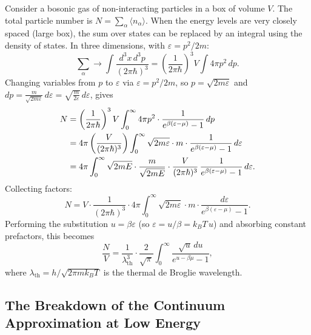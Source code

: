 Consider a bosonic gas of non-interacting particles in a box of volume $V$. The total particle number is $N = \sum_\alpha \langle n_\alpha\rangle$. When the energy levels are very closely spaced (large box), the sum over states can be replaced by an integral using the density of states. In three dimensions, with $\varepsilon = p^2/2m$:
\begin{equation}
    \sum_\alpha \to \int \frac{d^3x\,d^3p}{(2\pi\hbar)^3} = \left(\frac{1}{2\pi\hbar}\right)^3 V \int 4\pi p^2\,dp.
\end{equation}
Changing variables from $p$ to $\varepsilon$ via $\varepsilon = p^2/2m$, so $p = \sqrt{2m\varepsilon}$ and $dp = \frac{m}{\sqrt{2m\varepsilon}}\,d\varepsilon = \sqrt{\frac{m}{2\varepsilon}}\,d\varepsilon$, gives
\begin{align}
    N &= \left(\frac{1}{2\pi\hbar}\right)^3 V \int_0^\infty 4\pi p^2 \cdot \frac{1}{e^{\beta(\varepsilon-\mu)}-1}\,dp \notag \\
    &= 4\pi\left(\frac{V}{(2\pi\hbar)^3}\right)\int_0^\infty \sqrt{2m\varepsilon}\cdot m \cdot \frac{1}{e^{\beta(\varepsilon-\mu)}-1}\,d\varepsilon \notag \\
    &= 4\pi\int_0^\infty \sqrt{2mE}\cdot\frac{m}{\sqrt{2mE}}\cdot\frac{V}{(2\pi\hbar)^3}\,\frac{1}{e^{\beta(\varepsilon-\mu)}-1}\,d\varepsilon.
\end{align}
Collecting factors:
\begin{equation}
    N = V\cdot\frac{1}{(2\pi\hbar)^3}\cdot 4\pi\int_0^\infty \sqrt{2m\varepsilon}\cdot m\cdot\frac{d\varepsilon}{e^{\beta(\varepsilon-\mu)}-1}.
\end{equation}
Performing the substitution $u = \beta\varepsilon$ (so $\varepsilon = u/\beta = k_BT\,u$) and absorbing constant prefactors, this becomes
\begin{equation}
    \frac{N}{V} = \frac{1}{\lambda_{\text{th}}^3}\cdot\frac{2}{\sqrt{\pi}}\int_0^\infty \frac{\sqrt{u}\,du}{e^{u-\beta\mu}-1},
\end{equation}
where $\lambda_{\text{th}} = h/\sqrt{2\pi mk_BT}$ is the thermal de Broglie wavelength.

\subsection{The Breakdown of the Continuum Approximation at Low Energy}

